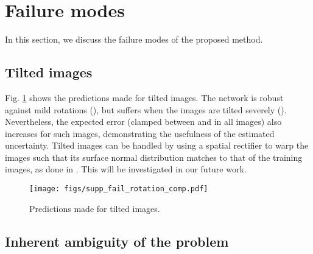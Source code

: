 \documentclass[10pt,twocolumn,letterpaper]{article}
\begin{document}


\newpage
\section{Failure modes}
\label{sec:failure}

In this section, we discuss the failure modes of the proposed method. 

\subsection{Tilted images}

Fig. \ref{fig:supp_fail_rotation} shows the predictions made for tilted images. The network is robust against mild rotations (), but suffers when the images are tilted severely (). Nevertheless, the expected error (clamped between  and  in all images) also increases for such images, demonstrating the usefulness of the estimated uncertainty. Tilted images can be handled by using a spatial rectifier to warp the images such that its surface normal distribution matches to that of the training images, as done in \cite{SNfromRGB_20_TiltedSN}. This will be investigated in our future work.

\begin{figure}[h]
\begin{center}
\texttt{[image: figs/supp\_fail\_rotation\_comp.pdf]}
\end{center}
\caption{Predictions made for tilted images.}
\label{fig:supp_fail_rotation}
\end{figure}

\subsection{Inherent ambiguity of the problem}
\end{document}
